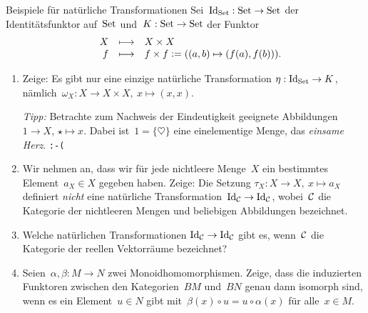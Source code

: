 \documentclass{uebblatt}
\begin{document}

\begin{aufgabe}{Beispiele für natürliche Transformationen}
Sei~$\mathrm{Id}_{\mathrm{Set}} : \mathrm{Set} \to \mathrm{Set}$ der Identitätsfunktor auf~$\mathrm{Set}$ und~$K : \mathrm{Set}
\to \mathrm{Set}$ der Funktor
\[ \begin{array}{@{}rrcl@{}}
  & X &\longmapsto& X \times X \\
  & f &\longmapsto& f \times f \defeq ((a,b) \mapsto (f(a),f(b))).
\end{array} \]
\begin{enumerate}
\item Zeige: Es gibt nur eine einzige natürliche Transformation $\eta : \mathrm{Id}_{\mathrm{Set}}
\to K$, nämlich~$\omega_X : X \to X \times X,\ x \mapsto (x,x)$.

{\tiny
\emph{Tipp:} Betrachte zum Nachweis der Eindeutigkeit geeignete Abbildungen $1 \to X$, $\star
\mapsto x$. Dabei ist~$1 = \{\heartsuit\}$ eine einelementige Menge, das
\emph{einsame Herz}. \texttt{:-(}\par}
\item Wir nehmen an, dass wir für jede nichtleere Menge~$X$ ein bestimmtes
Element~$a_X \in X$ gegeben haben. Zeige:
Die Setzung
$\tau_X : X \to X,\ x \mapsto a_X$
definiert \emph{nicht} eine natürliche Transformation~$\mathrm{Id}_{\mathcal{C}} \to \mathrm{Id}_{\mathcal{C}}$,
wobei~$\mathcal{C}$ die Kategorie der nichtleeren Mengen und beliebigen Abbildungen
bezeichnet.
\item
Welche natürlichen Transformationen $\mathrm{Id}_{\mathcal{C}} \to \mathrm{Id}_{\mathcal{C}}$ gibt es,
wenn~$\mathcal{C}$ die Kategorie der reellen Vektorräume bezeichnet?
\item Seien~$\alpha, \beta : M \to N$ zwei Monoidhomomorphismen. Zeige, dass
die induzierten Funktoren zwischen den Kategorien~$BM$ und~$BN$ genau dann
isomorph sind, wenn es ein Element~$u \in N$ gibt mit~$\beta(x) \circ u = u
\circ \alpha(x)$ für alle~$x \in M$.
\end{enumerate}
\end{aufgabe}
\end{document}
